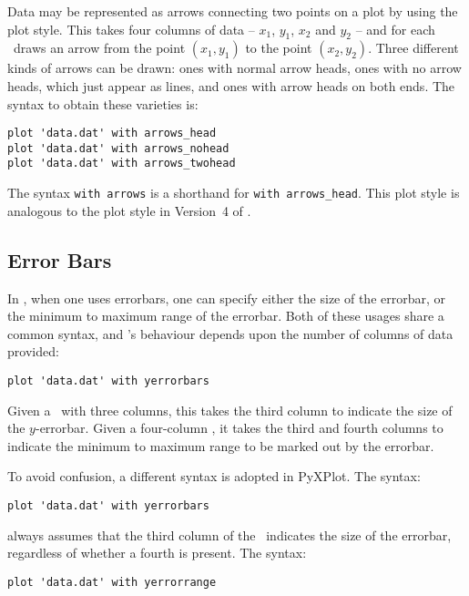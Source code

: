 Data may be represented as arrows connecting two points on a plot by using the
 plot style.  This takes four columns of data -- $x_1$, $y_1$,
$x_2$ and $y_2$ -- and for each \datapoint\ draws an arrow from the point
$(x_1,y_1)$ to the point $(x_2,y_2)$.  Three different kinds of arrows can be
drawn: ones with normal arrow heads, ones with no arrow heads, which just
appear as lines, and ones with arrow heads on both ends. The syntax to obtain
these varieties is:

\begin{verbatim}
plot 'data.dat' with arrows_head
plot 'data.dat' with arrows_nohead
plot 'data.dat' with arrows_twohead
\end{verbatim}

The syntax {\tt with arrows} is a shorthand for {\tt with arrows\_head}.  This
plot style is analogous to the  plot style in Version~4 of
\gnuplot.

\subsection{Error Bars}

\label{errorbars}
In \gnuplot, when one uses errorbars, one can specify either the size of the
errorbar, or the minimum to maximum range of the errorbar. Both of these usages
share a common syntax, and \gnuplot's behaviour depends upon the number of
columns of data provided:

\begin{verbatim}
plot 'data.dat' with yerrorbars
\end{verbatim}

\noindent Given a \datafile\ with three columns, this takes the third column to
indicate the size of the $y$-errorbar. Given a four-column \datafile, it takes
the third and fourth columns to indicate the minimum to maximum range to be
marked out by the errorbar.

To avoid confusion, a different syntax is adopted in PyXPlot. The syntax:

\begin{verbatim}
plot 'data.dat' with yerrorbars
\end{verbatim}

\noindent always assumes that the third column of the \datafile\ indicates the
size of the errorbar, regardless of whether a fourth is present. The syntax:

\begin{verbatim}
plot 'data.dat' with yerrorrange
\end{verbatim}

